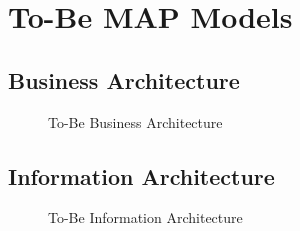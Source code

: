 \section{To-Be MAP Models}
\label{sec:to_be_map_model}
\subsection{Business Architecture}
\begin{center}
	\begin{figure}[H]
		\centering
		\setlength\fboxsep{7pt}
		\setlength\fboxrule{0.5pt}
		\caption{To-Be Business Architecture}
		\label{fig:map_business_to_be}
	\end{figure}
\end{center}
%

\subsection{Information Architecture}
\begin{center}
	\begin{figure}[H]
		\centering
		\setlength\fboxsep{7pt}
		\setlength\fboxrule{0.5pt}
		\caption{To-Be Information Architecture}
		\label{fig:map_application_to_be}
	\end{figure}
\end{center}
%

